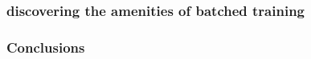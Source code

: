 \documentclass{beamer}
\begin{document}
\begin{frame}
  \frametitle{discovering the amenities of batched training}

    \begin{figure}[htb]
    \centering
  \end{figure}

\end{frame}


\begin{frame}
  \frametitle{Conclusions}

\end{frame}
\end{document}

